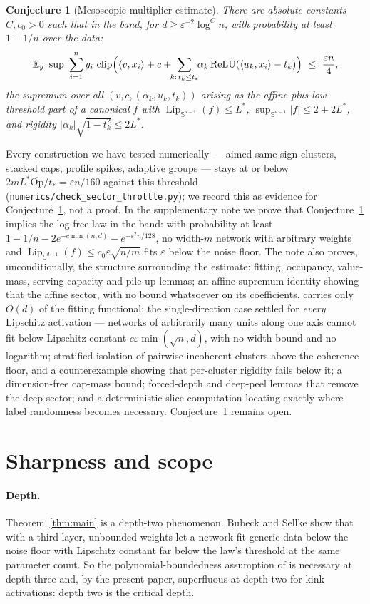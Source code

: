 \documentclass[11pt,reqno]{amsart}
\theoremstyle{plain}
\newtheorem{conjecture}[theorem]{Conjecture}
\theoremstyle{definition}
\theoremstyle{remark}
\newcommand{\Sd}{\mathbb{S}^{d-1}}
\newcommand{\EE}{\mathbb{E}}
\newcommand{\eps}{\varepsilon}
\newcommand{\Lip}{\operatorname{Lip}}
\newcommand{\relu}{\operatorname{ReLU}}
\newcommand{\inn}[2]{\langle #1,#2\rangle}
\DeclareMathOperator{\clip}{clip}
\begin{document}
\begin{conjecture}[Mesoscopic multiplier estimate]\label{conj:M}
There are absolute constants $C,c_0>0$ such that in the band, for $d\ge\eps^{-2}\log^Cn$, with probability at least $1-1/n$ over the data:
\[
\EE_y\ \sup\ \sum_{i=1}^ny_i\,\clip\Bigl(\inn v{x_i}+c+\!\!\sum_{k:\,t_k\le t_\ast}\!\!\alpha_k\relu(\inn{u_k}{x_i}-t_k)\Bigr)\ \le\ \frac{\eps n}4,
\]
the supremum over all $(v,c,(\alpha_k,u_k,t_k))$ arising as the affine-plus-low-threshold part of a canonical $f$ with $\Lip_{\Sd}(f)\le L^\ast$, $\sup_{\Sd}|f|\le2+2L^\ast$, and rigidity $|\alpha_k|\sqrt{1-t_k^2}\le2L^\ast$.
\end{conjecture}

Every construction we have tested numerically --- aimed same-sign clusters, stacked caps, profile spikes, adaptive groups --- stays at or below $2mL^\ast\overline{\mathrm{Op}}/t_\ast=\eps n/160$ against this threshold (\texttt{numerics/check\_sector\_throttle.py}); we record this as evidence for Conjecture~\ref{conj:M}, not a proof. In the supplementary note \cite{supp} we prove that Conjecture~\ref{conj:M} implies the log-free law in the band: with probability at least $1-1/n-2e^{-c\min(n,d)}-e^{-\eps^2n/128}$, no width-$m$ network with arbitrary weights and $\Lip_{\Sd}(f)\le c_0\eps\sqrt{n/m}$ fits $\eps$ below the noise floor. The note also proves, unconditionally, the structure surrounding the estimate: fitting, occupancy, value-mass, serving-capacity and pile-up lemmas; an affine supremum identity showing that the affine sector, with no bound whatsoever on its coefficients, carries only $O(d)$ of the fitting functional; the single-direction case settled for \emph{every} Lipschitz activation --- networks of arbitrarily many units along one axis cannot fit below Lipschitz constant $c\eps\min(\sqrt n,d)$, with no width bound and no logarithm; stratified isolation of pairwise-incoherent clusters above the coherence floor, and a counterexample showing that per-cluster rigidity fails below it; a dimension-free cap-mass bound; forced-depth and deep-peel lemmas that remove the deep sector; and a deterministic slice computation locating exactly where label randomness becomes necessary. Conjecture~\ref{conj:M} remains open.

\section{Sharpness and scope}\label{sec:scope}

\paragraph{Depth.} Theorem~\ref{thm:main} is a depth-two phenomenon. Bubeck and Sellke \cite[Section~A]{BS} show that with a third layer, unbounded weights let a network fit generic data below the noise floor with Lipschitz constant far below the law's threshold at the same parameter count. So the polynomial-boundedness assumption of \cite{BS} is necessary at depth three and, by the present paper, superfluous at depth two for kink activations: depth two is the critical depth.
\end{document}
